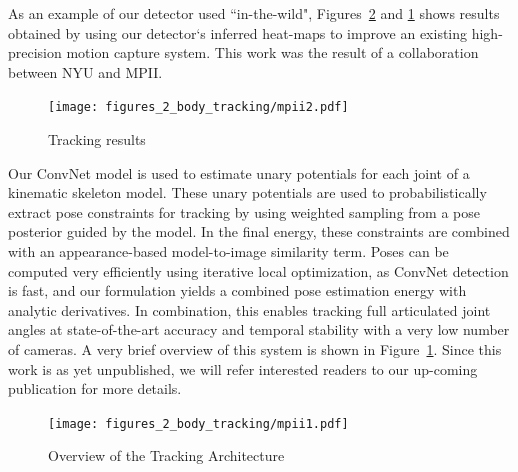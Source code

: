 As an example of our detector used ``in-the-wild", Figures~\ref{fig:mpii1} and \ref{fig:mpii2} shows results obtained by using our detector`s inferred heat-maps to improve an existing high-precision motion capture system. This work was the result of a collaboration between NYU and MPII.

\begin{figure}[th]
  \centering
    \texttt{[image: figures\_2\_body\_tracking/mpii2.pdf]}
    \caption{Tracking results}
  \label{fig:mpii2}
\end{figure}

Our ConvNet model is used to estimate unary potentials for each joint of a kinematic skeleton model. These unary potentials are used to probabilistically extract pose constraints for tracking by using weighted sampling from a pose posterior guided by the model. In the final energy, these constraints are combined with an appearance-based model-to-image similarity term. Poses can be computed very efficiently using iterative local optimization, as ConvNet detection is fast, and our formulation yields a combined pose estimation energy with analytic derivatives. In combination, this enables tracking full articulated joint angles at state-of-the-art accuracy and temporal stability with a very low number of cameras.  A very brief overview of this system is shown in Figure~\ref{fig:mpii2}.  Since this work is as yet unpublished, we will refer interested readers to our up-coming publication for more details.

\begin{figure}[th]
  \centering
    \texttt{[image: figures\_2\_body\_tracking/mpii1.pdf]}
    \caption{Overview of the Tracking Architecture}
  \label{fig:mpii1}
\end{figure}
